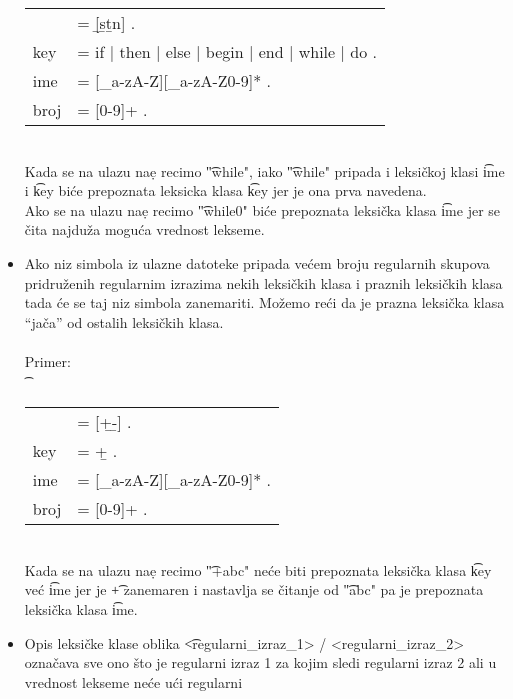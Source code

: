 \begin{itemize}
{{\begin{tabular}{ll}
                  &= [{\b}s{\b}t{\b}n] .\\
              key &= if | then | else | begin | end | while | do .\\
              ime &= [\_a-zA-Z][\_a-zA-Z0-9]* . \\
              broj&= [0-9]+ .\\
            \end{tabular}
          }\\
          Kada se na ulazu na\d e recimo \t{"while"}, iako \t{"while"}
          pripada i leksi\v ckoj klasi \t{ime} i \t{key} bi\'ce prepoznata
          leksicka klasa \t{key} jer je ona prva navedena.\\
          Ako se na ulazu na\d e recimo \t{"while0"} bi\'ce prepoznata
          leksi\v cka klasa \t{ime} jer se \v cita najdu\v za mogu\'ca
          vrednost lekseme.
        }
        \item
        {
          Ako niz simbola iz ulazne datoteke pripada ve\'cem broju regularnih
          skupova pridru\v zenih regularnim izrazima nekih leksi\v ckih
          klasa i praznih leksi\v ckih klasa tada \'ce se taj niz simbola
          zanemariti.
          Mo\v zemo re\'ci da je prazna leksi\v cka klasa ``ja\v ca'' od
          ostalih leksi\v ckih klasa.\\
          \\
          Primer:\\
          \t
          {
            \begin{tabular}{ll}
                  &= [\b+\b-] .\\
              key &= \b+ .\\
              ime &= [\_a-zA-Z][\_a-zA-Z0-9]* . \\
              broj&= [0-9]+ .\\
            \end{tabular}
          }\\
          Kada se na ulazu na\d e recimo \t{"+abc"} ne\'ce biti prepoznata
          leksi\v cka klasa \t{key} ve\'c \t{ime} jer je \t{+} zanemaren i
          nastavlja se \v citanje od \t{"abc"} pa je prepoznata
          leksi\v cka klasa \t{ime}.
        }
        \item
        {
          Opis leksi\v cke klase oblika
          \t{<regularni\_izraz\_1> / <regularni\_izraz\_2>}\\
          ozna\v cava sve ono \v sto je regularni izraz 1 za kojim sledi
          regularni izraz 2 ali u vrednost lekseme ne\'ce u\'ci regularni
}
\end{itemize}
